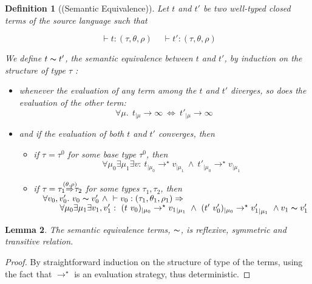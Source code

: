 \documentclass[a4paper,12pt,oneside]{report}
\theoremstyle{plain}
\newtheorem{definition}{Definition}[section]
\newtheorem{lemma}[definition]{Lemma}
\newcommand{\tmapp}[2]{(#1 ~ #2)}
\newcommand{\ty}[1]{\tau_{#1}}
\newcommand{\tyarr}[3]
{\tau_{#1}\hspace*{-0.2cm}\stackrel{#3}{\Rightarrow}\hspace*{-0.2cm}\tau_{#2}}
\newcommand{\typerule}[5]{~\vdash  #1 : (#2, #3, #4) #5}
\newcommand{\evalstar}[4]{~#1_{|\mu_#2} \rightarrow^{\star} #3_{|\mu_#4} ~}
\newcommand{\evalinfty}[2]{~#1_{|#2} \rightarrow \infty ~}
\newcommand{\eqv}[2]{#1 \thicksim #2}
\begin{document}
\label{semantic equivalence}
\begin{definition}[(Semantic Equivalence)]
	Let $t$ and $t'$ be two well-typed closed terms of the source language
	such that 
	
	$$
		\typerule{t}{\tau}{\theta}{\rho}{} \quad \typerule{t'}{\tau}{\theta}{\rho}{} 
	$$

	We define $\eqv{t}{t'}$, the \textit{semantic equivalence} between $t$
	and $t'$, by induction on the structure of type $\tau$ :
	
	\begin{itemize}
	 	\item[$(\alpha)$] whenever the evaluation of any term among the $t$ and $t'$ 
	 	diverges, so does the evaluation of the other term: 
	 	$$\forall \mu.~ \evalinfty{t}{\mu} \Leftrightarrow \evalinfty{t'}{\mu}$$ 	 	
	 	
		\item[$(\beta)$] and if the evaluation of both $t$ and $t'$ converges, 
		then 
		
		\begin{itemize}
		\item[$(\beta_1)$]
			if $\ty{} = \ty{}^0$ for some base type $\ty{}^0$, then
			$$ \forall \mu_0 \exists \mu_1 \exists v: 
			\evalstar{t}{0}{v}{1} \wedge \evalstar{t'}{0}{v}{1}$$
		
		
		\item[$(\beta_2)$]
			if $\ty{} = \tyarr{1}{2}{(\theta,\rho)}$ for some types $\ty{1}, \ty{2}$,
			then\\[0.2cm]
			$\hspace*{1em}\forall v_0, v'_0. ~ \eqv{v_0}{v'_0} ~ 
			\wedge \typerule{v_0}{\ty{1}}{\theta_1}{\rho_1}{} \Rightarrow$ \\[0.2cm]		
			$\hspace*{2em}\quad \forall \mu_0 \exists \mu_1 \exists v_1, v'_1 : 
			 	\evalstar{\tmapp{t}{v_0}}{0}{{v_1}}{1} 
				\wedge \evalstar{\tmapp{t'}{v'_0}}{0}{{v'_1}}{1}
				\wedge\eqv{v_1}{v'_1}$	
	
		\end{itemize}
	\end{itemize}		
	\end{definition}



	\begin{lemma} 
		The semantic equivalence 	terms, $\thicksim$, is reflexive, 	
		symmetric and transitive relation.
	\end{lemma}
	
	\begin{proof}
		By straightforward induction on the structure of type of the terms, using 
		the fact that $\rightarrow^\star$ is an evaluation strategy, thus 
		deterministic.
	\end{proof}
\end{document}

